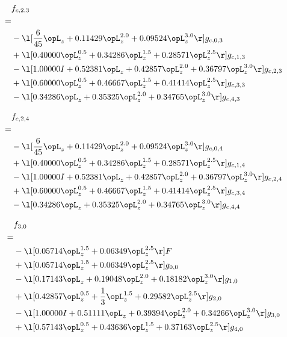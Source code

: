 \begin{alignat}{2} 
\label{eq:f_23_0} 
& f_{c,2,3} \nonumber \\ 
 = \\ 
& - \l[ \frac{6}{45} \opL_z +  0.11429 \opL_z^{2.0} +  0.09524 \opL_z^{3.0}  \r] g_{c,0,3} \nonumber \\ 
& + \l[  0.40000 \opL_z^{0.5} +  0.34286 \opL_z^{1.5} +  0.28571 \opL_z^{2.5}  \r] g_{c,1,3} \nonumber \\ 
& - \l[  1.00000 I +  0.52381 \opL_z +  0.42857 \opL_z^{2.0} +  0.36797 \opL_z^{3.0}  \r] g_{c,2,3} \nonumber \\ 
& + \l[  0.60000 \opL_z^{0.5} +  0.46667 \opL_z^{1.5} +  0.41414 \opL_z^{2.5}  \r] g_{c,3,3} \nonumber \\ 
& - \l[  0.34286 \opL_z +  0.35325 \opL_z^{2.0} +  0.34765 \opL_z^{3.0}  \r] g_{c,4,3} \nonumber \\ 
\end{alignat} 


\begin{alignat}{2} 
\label{eq:f_24_0} 
& f_{c,2,4} \nonumber \\ 
 = \\ 
& - \l[ \frac{6}{45} \opL_z +  0.11429 \opL_z^{2.0} +  0.09524 \opL_z^{3.0}  \r] g_{c,0,4} \nonumber \\ 
& + \l[  0.40000 \opL_z^{0.5} +  0.34286 \opL_z^{1.5} +  0.28571 \opL_z^{2.5}  \r] g_{c,1,4} \nonumber \\ 
& - \l[  1.00000 I +  0.52381 \opL_z +  0.42857 \opL_z^{2.0} +  0.36797 \opL_z^{3.0}  \r] g_{c,2,4} \nonumber \\ 
& + \l[  0.60000 \opL_z^{0.5} +  0.46667 \opL_z^{1.5} +  0.41414 \opL_z^{2.5}  \r] g_{c,3,4} \nonumber \\ 
& - \l[  0.34286 \opL_z +  0.35325 \opL_z^{2.0} +  0.34765 \opL_z^{3.0}  \r] g_{c,4,4} \nonumber \\ 
\end{alignat} 


\begin{alignat}{2} 
\label{eq:f_30_0} 
& f_{3,0} \nonumber \\ 
 = \\ 
& - \l[  0.05714 \opL_z^{1.5} +  0.06349 \opL_z^{2.5}  \r] F \nonumber \\ 
& + \l[  0.05714 \opL_z^{1.5} +  0.06349 \opL_z^{2.5}  \r] g_{0,0} \nonumber \\ 
& - \l[  0.17143 \opL_z +  0.19048 \opL_z^{2.0} +  0.18182 \opL_z^{3.0}  \r] g_{1,0} \nonumber \\ 
& + \l[  0.42857 \opL_z^{0.5} + \frac{1}{3} \opL_z^{1.5} +  0.29582 \opL_z^{2.5}  \r] g_{2,0} \nonumber \\ 
& - \l[  1.00000 I +  0.51111 \opL_z +  0.39394 \opL_z^{2.0} +  0.34266 \opL_z^{3.0}  \r] g_{3,0} \nonumber \\ 
& + \l[  0.57143 \opL_z^{0.5} +  0.43636 \opL_z^{1.5} +  0.37163 \opL_z^{2.5}  \r] g_{4,0} \nonumber \\ 
\end{alignat} 


